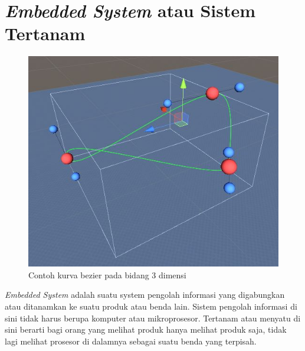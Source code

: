 \section{\textit{Embedded System} atau Sistem Tertanam}
\vspace{1ex}

\begin{figure} [!htb]
	\captionsetup{justification=centering}
	\includegraphics[scale=0.4]{img/contoh-kurva-bezier.JPG}
	\caption{Contoh kurva bezier pada bidang 3 dimensi}
	\label{fig:2.1}
\end{figure}

\textit{Embedded System} adalah suatu system pengolah informasi yang digabungkan atau ditanamkan ke suatu produk atau benda lain. Sistem pengolah informasi di sini tidak harus berupa komputer atau mikroprosesor. Tertanam atau menyatu di sini berarti bagi orang yang melihat produk hanya melihat produk saja, tidak lagi melihat prosesor di dalamnya sebagai suatu benda yang terpisah.
\vspace{1ex}
